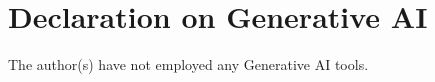 \documentclass[
]{ceurart}
\begin{document}
\section*{Declaration on Generative AI}
The author(s) have not employed any Generative AI tools.


\end{document}
